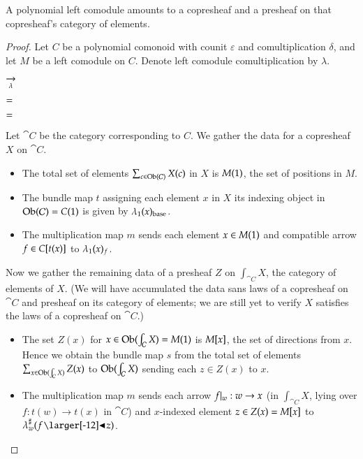 \documentclass{amsart}
\begin{document}
\begin{prop}
  A polynomial left comodule amounts to a copresheaf and a presheaf on that
  copresheaf's category of elements.
\end{prop}
\begin{proof}
  Let $C$ be a polynomial comonoid with counit $\varepsilon$ and
  comultiplication $\delta$, and let $M$ be a left comodule on
  $C$. Denote left comodule comultiplication by $\lambda$.

  \begin{center}
    
    \hspace{-.75em}
    $\underset{\lambda}{\to}$
    \hspace{.5em}
    
  \end{center}

  \begin{center}
    
    \quad
    $=$
    
  \end{center}
  
  \begin{center}
    
    \quad
    $=$
    \quad
    
  \end{center}

  Let $\cat{C}$ be the category corresponding to $C$. We gather the
  data for a copresheaf $X$ on $\cat{C}$.
  \begin{itemize}
  \item The total set of elements $\sum_{c \in \operatorname{Ob}(\mathcal{C})}X(c)$ in
    $X$ is $M(1)$, the set of positions in $M$.
  \item The bundle map $t$ assigning each element $x$ in $X$ its indexing
    object in $\operatorname{Ob}(\mathcal{C}) = C(1)$ is given by ${\lambda}_1(x)_{\mathrm{base}}$.
  \item The multiplication map $m$ sends each element $x \in M(1)$
    and compatible arrow $f \in C[t(x)]$ to
    ${\lambda}_1(x)_f$.
  \end{itemize}

  Now we gather the remaining data of a presheaf $Z$ on
  $\int_{\cat{C}}X$, the category of elements of $X$. (We will have
  accumulated the data sans laws of a copresheaf on $\cat{C}$ and
  presheaf on its category of elements; we are still yet to
  verify $X$ satisfies the laws of a copresheaf on $\cat{C}$.)
  \begin{itemize}
  \item The set $Z(x)$ for $x \in \operatorname{Ob}(\int_{\mathcal{C}}X) = M(1)$ is
    $M[x]$, the set of directions from $x$. Hence we obtain the
    bundle map $s$ from the total set of elements
    $\sum_{x \in \operatorname{Ob}(\int_{\mathcal{C}}X)}Z(x)$ to $\operatorname{Ob}(\int_{\mathcal{C}}X)$
    sending each $z \in Z(x)$ to $x$.
  \item The multiplication map $m$ sends each arrow $f|_{w}: w \to x$
    (in $\int_{\cat{C}}X$, lying over $f: t(w) \to t(x)$ in $\cat{C}$)
    and $x$-indexed element $z \in Z(x) = M[x]$ to
    $\dirmapof{\lambda}{w}{f \subd z}$.


\end{itemize}
\end{proof}
\end{document}
